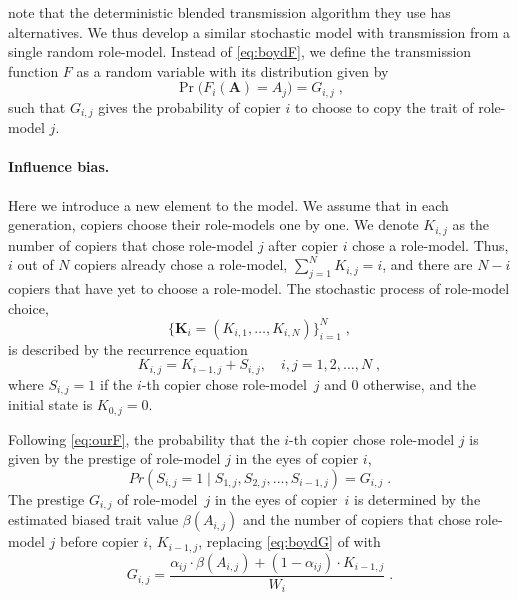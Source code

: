 \documentclass[12pt]{extarticle}
\let\vec\mathbf
\begin{document}
\citet{evolutionBook} note that the deterministic blended transmission algorithm they use has alternatives. We thus develop a similar stochastic model with transmission from a single random role-model. Instead of \cref{eq:boydF}, we define the transmission function $F$ as a random variable with its distribution given by 
\begin{equation}\label{eq:ourF}
\Pr\big(F_i(\vec{A}) = A_{j}\big) = G_{i,j} \;,
\end{equation}
such that $G_{i,j}$ gives the probability of copier $i$ to choose to copy the trait of role-model $j$.

\paragraph{Influence bias.}
Here we introduce a new element to the model.
We assume that in each generation, copiers choose their role-models one by one.
We denote $K_{i,j}$ as the number of copiers that chose role-model $j$ after copier $i$ chose a role-model. Thus, $i$ out of $N$ copiers already chose a role-model, $\sum_{j=1}^N{K_{i,j}} = i$, and there are $N-i$ copiers that have yet to choose a role-model.
The stochastic process of role-model choice, 
\begin{equation} \label{eq:process}
\big\{\vec{K}_i = (K_{i,1}, \ldots, K_{i,N}) \big\}_{i=1}^N \;,
\end{equation}
is described by the recurrence equation
\begin{equation} \label{eq:recurrence}
K_{i,j} = K_{i-1,j} + S_{i,j}, \quad i,j=1,2,\ldots,N \;,
\end{equation}
where $S_{i,j}=1$ if the $i$-th copier chose role-model~$j$ and 0 otherwise, and the initial state is $K_{0,j}=0$.

Following \cref{eq:ourF}, the probability that the $i$-th copier chose role-model $j$ is given by the prestige of role-model $j$ in the eyes of copier $i$,
\begin{equation}\label{eq:recPrestige}
Pr(S_{i,j}=1 \mid S_{1,j},S_{2,j},...,S_{i-1,j}) = G_{i,j} \;.
\end{equation}
The prestige $G_{i,j}$ of role-model~$j$ in the eyes of copier~$i$ is determined by the estimated biased trait value $\beta(A_{i,j})$ and the number of copiers that chose role-model $j$ before copier $i$, $K_{i-1,j}$, replacing \cref{eq:boydG} of \citet{evolutionBook} with
\begin{equation}\label{eq:prestige}
G_{i,j} = \frac{\alpha_{ij} \cdot \beta(A_{i,j}) + (1-\alpha_{ij}) \cdot K_{i-1,j}}{W_i} \;.
\end{equation}
\end{document}
